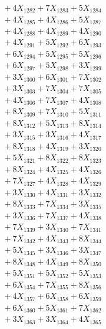 \documentclass[a4paper,10pt]{article}
\begin{document}
{\begin{align}
&\;  + 4 X_{1282} + 7 X_{1283} + 5 X_{1284} \\[0.3ex]
&\;  + 4 X_{1285} + 4 X_{1286} + 5 X_{1287} \\[0.3ex]
&\;  + 4 X_{1288} + 4 X_{1289} + 4 X_{1290} \\[0.3ex]
&\;  + 4 X_{1291} + 5 X_{1292} + 6 X_{1293} \\[0.3ex]
&\;  + 6 X_{1294} + 5 X_{1295} + 5 X_{1296} \\[0.3ex]
&\;  + 6 X_{1297} + 5 X_{1298} + 3 X_{1299} \\[0.5ex]\allowbreak
&\;  + 3 X_{1300} + 6 X_{1301} + 7 X_{1302} \\[0.3ex]
&\;  + 3 X_{1303} + 7 X_{1304} + 7 X_{1305} \\[0.3ex]
&\;  + 4 X_{1306} + 7 X_{1307} + 4 X_{1308} \\[0.3ex]
&\;  + 8 X_{1309} + 7 X_{1310} + 5 X_{1311} \\[0.3ex]
&\;  + 8 X_{1312} + 5 X_{1313} + 8 X_{1314} \\[0.3ex]
&\;  + 3 X_{1315} + 3 X_{1316} + 4 X_{1317} \\[0.3ex]
&\;  + 8 X_{1318} + 4 X_{1319} + 3 X_{1320} \\[0.3ex]
&\;  + 5 X_{1321} + 8 X_{1322} + 8 X_{1323} \\[0.3ex]
&\;  + 8 X_{1324} + 4 X_{1325} + 4 X_{1326} \\[0.3ex]
&\;  + 7 X_{1327} + 4 X_{1328} + 4 X_{1329} \\[0.5ex]\allowbreak
&\;  + 3 X_{1330} + 4 X_{1331} + 3 X_{1332} \\[0.3ex]
&\;  + 8 X_{1333} + 7 X_{1334} + 3 X_{1335} \\[0.3ex]
&\;  + 3 X_{1336} + 7 X_{1337} + 4 X_{1338} \\[0.3ex]
&\;  + 7 X_{1339} + 3 X_{1340} + 7 X_{1341} \\[0.3ex]
&\;  + 7 X_{1342} + 4 X_{1343} + 8 X_{1344} \\[0.3ex]
&\;  + 5 X_{1345} + 3 X_{1346} + 3 X_{1347} \\[0.3ex]
&\;  + 8 X_{1348} + 4 X_{1349} + 8 X_{1350} \\[0.3ex]
&\;  + 5 X_{1351} + 5 X_{1352} + 5 X_{1353} \\[0.3ex]
&\;  + 6 X_{1354} + 7 X_{1355} + 8 X_{1356} \\[0.3ex]
&\;  + 4 X_{1357} + 6 X_{1358} + 6 X_{1359} \\[0.5ex]\allowbreak
&\;  + 6 X_{1360} + 5 X_{1361} + 7 X_{1362} \\[0.3ex]
&\;  + 3 X_{1363} + 3 X_{1364} + 4 X_{1365} \\[0.3ex]

\end{align}}
\end{document}

